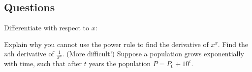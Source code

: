 \subsection*{Questions}
\begin{questions}
  \question Differentiate with respect to $ x $:
  \question Explain why you cannot use the power rule to find the derivative of $ x^x $.
  \question Find the $ n$th derivative of $ \frac{1}{x^n} $.
  \question (More difficult!) Suppose a population grows exponentially with time, such that after $ t $ years the population $ P = P_0 + 10^t $.
\end{questions}

